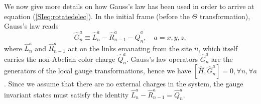 \documentclass[twocolumn,aps,showpacs,prb,superscriptaddress,floatfix,10pt,nofootinbib]{revtex4-2}
\begin{document}
We now give more details on how Gauss's law has been used in order to arrive at equation (\ref{SIeq:rotatedelec}).
In the initial frame (before the $\hat{\Theta}$ transformation),  Gauss's law reads
\begin{equation}
\hat{G}_{n}^{a}\equiv \hat{L}_{n}^{a}-\hat{R}_{n-1}^{a}-\hat{Q}_{n}^{a}, \quad a=x,y,z,
\end{equation}
where $\hat{L}_{n}^{a}$ and $\hat{R}_{n-1}^{a}$ act on the links emanating from the site $n$, which itself carries the non-Abelian color charge $\hat{Q}_{n}^{a}$. Gauss's law operators $\hat{G}_{n}^{a}$ are the generators of the local gauge transformations, hence we have $[\hat{H},\hat{G}_{n}^{a}]=0, \forall n, \forall a$. Since we assume that there are no external charges in the system, the gauge invariant states must satisfy the identity $\hat{L}_{n}^{a} - \hat{R}_{n-1}^{a} = \hat{Q}_{n}^{a}$. 
\end{document}
